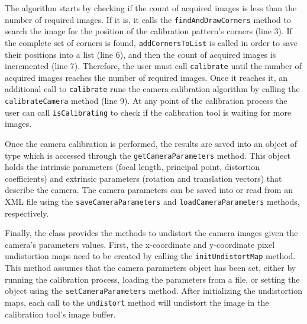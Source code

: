 The algorithm starts by checking if the count of acquired images is less than the number of required images.
If it is, it calls the \texttt{find\-And\-Draw\-Cor\-ners} method to search the image for the position of the 
calibration pattern's corners (line 3). If the complete set of corners is found, \texttt{add\-Cor\-ners\-To\-List} is 
called in order to save their positions into a list (line 6), and then the count of acquired images is incremented
(line 7). Therefore, the user must call \texttt{cal\-i\-brate} until the number of acquired images reaches 
the number of required images. Once it reaches it, an additional call to \texttt{cal\-i\-brate} runs the camera 
calibration algorithm by calling the \texttt{cal\-i\-brate\-Cam\-er\-a} method (line 9). At any point of the 
calibration process the user can call \texttt{is\-Cal\-i\-brat\-ing} to check if the calibration tool is waiting for 
more images.

Once the camera calibration is performed, the results are saved into an object of type \CameraParameters{}
which is accessed through the \texttt{get\-Cam\-e\-ra\-Pa\-ram\-e\-ters} method. This object holds the 
intrinsic parameters (focal length, principal point, distortion coefficients) and extrinsic parameters 
(rotation and translation vectors) that describe the camera. The camera parameters can be saved into 
or read from an XML file using the \texttt{save\-Cam\-er\-aPa\-ram\-e\-ters} and 
\texttt{load\-Cam\-er\-a\-Pa\-ram\-e\-ters} methods, respectively. 

Finally, the \CalibrationTool{} class provides the methods to undistort the camera images given the camera's
parameters values. First, the x-coordinate and y-coordinate pixel undistortion maps need to be created by 
calling the \texttt{in\-it\-Un\-dis\-tort\-Map} method. This method assumes that the camera parameters object 
has been set, either by running the calibration process, loading the parameters from a file, or setting the 
object using the \texttt{set\-Cam\-er\-a\-Pa\-ram\-e\-ters} method. After initializing the undistortion maps, 
each call to the \texttt{un\-dis\-tort} method will undistort the image in the calibration tool's image buffer.


